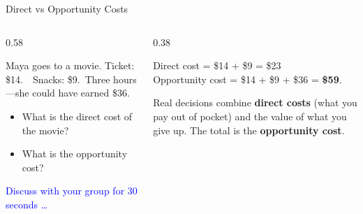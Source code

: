 \documentclass[9pt,english,aspectratio=169]{beamer}
\begin{document}
\begin{frame}{Direct vs Opportunity Costs}

\begin{columns}[T]
    \begin{column}{0.58\textwidth}
  \begin{questionbox}
    Maya goes to a movie. Ticket: \$14.\ \ Snacks: \$9.\
    Three hours---she could have earned \$36.
    \begin{itemize}
    	\item What is the direct cost of the movie? 
    	\item What is the opportunity cost?
    \end{itemize}
      \end{questionbox}
        
        \vspace{0.8em}
        
        \Large\textcolor{blue}{Discuss with your group for 30 seconds \ldots}
        
        \pause 
    \end{column}
    
    \begin{column}{0.38\textwidth} 

  \vspace{0.5em}
  \begin{answerbox}
    Direct cost = \$14 + \$9  = \$23 \\
    Opportunity cost = \$14 + \$9 + \$36 = \textbf{\$59}.
  \end{answerbox}

  \vspace{0.5em}
  \begin{insightbox}
  Real decisions combine \textbf{direct costs} (what you pay out of
  pocket) and the value of what you give up. The total is the \textbf{opportunity cost}. 
  \end{insightbox}
    \end{column}
\end{columns}
  
\end{frame}
\end{document}
